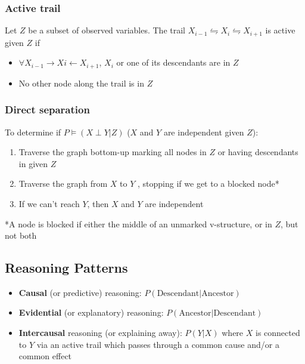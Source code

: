 \documentclass[]{article}
\begin{document}
\subsubsection{Active trail}

Let $Z$ be a subset of observed variables.
The trail $X_{i-1} \leftrightharpoons X_i \leftrightharpoons X_{i+1}$ is active given $Z$ if
\begin{itemize}
	\item $\forall X_{i-1} \rightarrow Xi \leftarrow X_{i+1}$, $X_i$ or one of its descendants are in $Z$
	\item No other node along the trail is in $Z$
\end{itemize}

\subsubsection{Direct separation}

To determine if $P \models (X \perp Y | Z)$ ($X$ and $Y$ are independent given $Z$):

\begin{enumerate}
	\item Traverse the graph bottom-up marking all nodes in $Z$ or having descendants in given $Z$
	\item Traverse the graph from $X$ to $Y$ , stopping if we get to a blocked node*
	\item If we can't reach $Y$, then $X$ and $Y$ are independent
\end{enumerate}

*A node is blocked if either the middle of an unmarked v-structure, or in $Z$, but not both

\subsection{Reasoning Patterns}

\begin{itemize}
	\item \textbf{Causal} (or predictive) reasoning: $P(\text{Descendant} | \text{Ancestor})$
	\item \textbf{Evidential} (or explanatory) reasoning: $P(\text{Ancestor} | \text{Descendant})$
	\item \textbf{Intercausal} reasoning (or explaining away): $P(Y|X)$ where $X$ is connected to $Y$ via an active trail which passes through a common cause and/or a common effect
\end{itemize}
\end{document}
